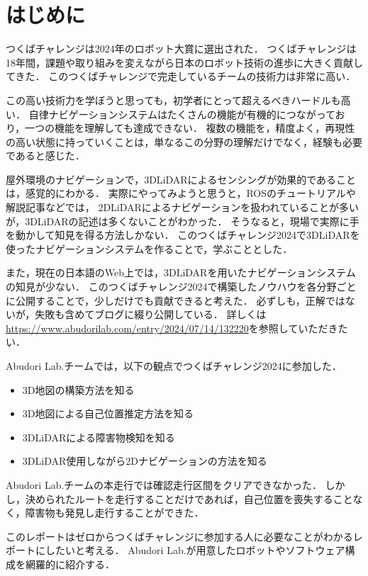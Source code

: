 \section{はじめに}
つくばチャレンジは2024年のロボット大賞に選出\cite{tsukuba}された．
つくばチャレンジは18年間，課題や取り組みを変えながら日本のロボット技術の進歩に大きく貢献してきた．
このつくばチャレンジで完走しているチームの技術力は非常に高い．

この高い技術力を学ぼうと思っても，初学者にとって超えるべきハードルも高い．
自律ナビゲーションシステムはたくさんの機能が有機的につながっており，一つの機能を理解しても達成できない．
複数の機能を，精度よく，再現性の高い状態に持っていくことは，単なるこの分野の理解だけでなく，経験も必要であると感じた．

屋外環境のナビゲーションで，3DLiDARによるセンシングが効果的であることは，感覚的にわかる．
実際にやってみようと思うと，ROSのチュートリアルや解説記事などでは，
2DLiDARによるナビゲーションを扱われていることが多いが，3DLiDARの記述は多くないことがわかった．
そうなると，現場で実際に手を動かして知見を得る方法しかない．
このつくばチャレンジ2024で3DLiDARを使ったナビゲーションシステムを作ることで，学ぶこととした．

また，現在の日本語のWeb上では，3DLiDARを用いたナビゲーションシステムの知見が少ない．
このつくばチャレンジ2024で構築したノウハウを各分野ごとに公開することで，少しだけでも貢献できると考えた．
必ずしも，正解ではないが，失敗も含めてブログに綴り公開している．
詳しくは\url{https://www.abudorilab.com/entry/2024/07/14/132220}を参照していただきたい．


Abudori Lab.チームでは，以下の観点でつくばチャレンジ2024に参加した．
\begin{itemize}
    \item 3D地図の構築方法を知る
    \item 3D地図による自己位置推定方法を知る
    \item 3DLiDARによる障害物検知を知る
    \item 3DLiDAR使用しながら2Dナビゲーションの方法を知る
\end{itemize}

Abudori Lab.チームの本走行では確認走行区間をクリアできなかった．
しかし，決められたルートを走行することだけであれば，自己位置を喪失することなく，障害物も発見し走行することができた．

このレポートはゼロからつくばチャレンジに参加する人に必要なことがわかるレポートにしたいと考える．
Abudori Lab.が用意したロボットやソフトウェア構成を網羅的に紹介する．